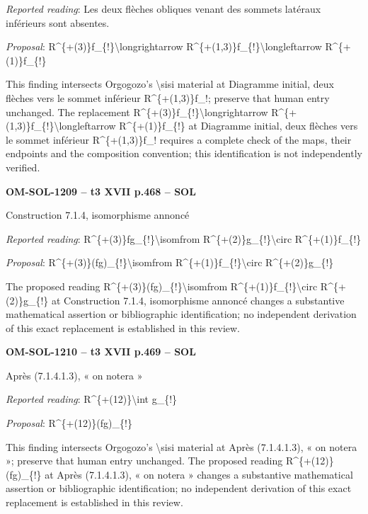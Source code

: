 \emph{Reported reading}: Les deux flèches obliques venant des sommets latéraux inférieurs sont absentes.\par
\emph{Proposal}: R\textasciicircum{}\{+(3)\}f\_\{!\}\textbackslash{}longrightarrow R\textasciicircum{}\{+(1,3)\}f\_\{!\}\textbackslash{}longleftarrow R\textasciicircum{}\{+(1)\}f\_\{!\}\par
This finding intersects Orgogozo's \textbackslash{}sisi material at Diagramme initial, deux flèches vers le sommet inférieur R\textasciicircum{}\{+(1,3)\}f\_!; preserve that human entry unchanged. The replacement R\textasciicircum{}\{+(3)\}f\_\{!\}\textbackslash{}longrightarrow R\textasciicircum{}\{+(1,3)\}f\_\{!\}\textbackslash{}longleftarrow R\textasciicircum{}\{+(1)\}f\_\{!\} at Diagramme initial, deux flèches vers le sommet inférieur R\textasciicircum{}\{+(1,3)\}f\_! requires a complete check of the maps, their endpoints and the composition convention; this identification is not independently verified.\par
\par\noindent\textbf{OM-SOL-1209 -- t3 XVII p.468 -- SOL}\par
Construction 7.1.4, isomorphisme annoncé\par
\emph{Reported reading}: R\textasciicircum{}\{+(3)\}fg\_\{!\}\textbackslash{}isomfrom R\textasciicircum{}\{+(2)\}g\_\{!\}\textbackslash{}circ R\textasciicircum{}\{+(1)\}f\_\{!\}\par
\emph{Proposal}: R\textasciicircum{}\{+(3)\}(fg)\_\{!\}\textbackslash{}isomfrom R\textasciicircum{}\{+(1)\}f\_\{!\}\textbackslash{}circ R\textasciicircum{}\{+(2)\}g\_\{!\}\par
The proposed reading R\textasciicircum{}\{+(3)\}(fg)\_\{!\}\textbackslash{}isomfrom R\textasciicircum{}\{+(1)\}f\_\{!\}\textbackslash{}circ R\textasciicircum{}\{+(2)\}g\_\{!\} at Construction 7.1.4, isomorphisme annoncé changes a substantive mathematical assertion or bibliographic identification; no independent derivation of this exact replacement is established in this review.\par
\par\noindent\textbf{OM-SOL-1210 -- t3 XVII p.469 -- SOL}\par
Après (7.1.4.1.3), « on notera »\par
\emph{Reported reading}: R\textasciicircum{}\{+(12)\}\textbackslash{}int g\_\{!\}\par
\emph{Proposal}: R\textasciicircum{}\{+(12)\}(fg)\_\{!\}\par
This finding intersects Orgogozo's \textbackslash{}sisi material at Après (7.1.4.1.3), « on notera »; preserve that human entry unchanged. The proposed reading R\textasciicircum{}\{+(12)\}(fg)\_\{!\} at Après (7.1.4.1.3), « on notera » changes a substantive mathematical assertion or bibliographic identification; no independent derivation of this exact replacement is established in this review.\par
